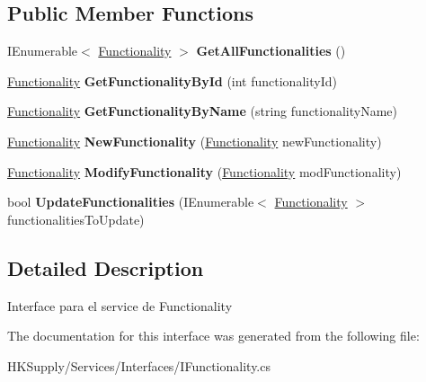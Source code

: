 \subsection*{Public Member Functions}
\begin{DoxyCompactItemize}
\item 
\mbox{\label{interface_h_k_supply_1_1_services_1_1_interfaces_1_1_i_functionality_aa1f16fee3ce5743db02605b4fd2184fc}} 
I\+Enumerable$<$ \hyperlink{class_h_k_supply_1_1_models_1_1_functionality}{Functionality} $>$ {\bfseries Get\+All\+Functionalities} ()
\item 
\mbox{\label{interface_h_k_supply_1_1_services_1_1_interfaces_1_1_i_functionality_a7652aa4269664c60c38868ca5691b39e}} 
\hyperlink{class_h_k_supply_1_1_models_1_1_functionality}{Functionality} {\bfseries Get\+Functionality\+By\+Id} (int functionality\+Id)
\item 
\mbox{\label{interface_h_k_supply_1_1_services_1_1_interfaces_1_1_i_functionality_a8b71832d394e3900a477c05c346489df}} 
\hyperlink{class_h_k_supply_1_1_models_1_1_functionality}{Functionality} {\bfseries Get\+Functionality\+By\+Name} (string functionality\+Name)
\item 
\mbox{\label{interface_h_k_supply_1_1_services_1_1_interfaces_1_1_i_functionality_ac11ba1039efa6437e0669e9617ea5c9c}} 
\hyperlink{class_h_k_supply_1_1_models_1_1_functionality}{Functionality} {\bfseries New\+Functionality} (\hyperlink{class_h_k_supply_1_1_models_1_1_functionality}{Functionality} new\+Functionality)
\item 
\mbox{\label{interface_h_k_supply_1_1_services_1_1_interfaces_1_1_i_functionality_a31203a06c78db03a2c9a69c0fa1a0865}} 
\hyperlink{class_h_k_supply_1_1_models_1_1_functionality}{Functionality} {\bfseries Modify\+Functionality} (\hyperlink{class_h_k_supply_1_1_models_1_1_functionality}{Functionality} mod\+Functionality)
\item 
\mbox{\label{interface_h_k_supply_1_1_services_1_1_interfaces_1_1_i_functionality_a7408965d17ce5d8a6fea11ac392ed451}} 
bool {\bfseries Update\+Functionalities} (I\+Enumerable$<$ \hyperlink{class_h_k_supply_1_1_models_1_1_functionality}{Functionality} $>$ functionalities\+To\+Update)
\end{DoxyCompactItemize}


\subsection{Detailed Description}
Interface para el service de Functionality 



The documentation for this interface was generated from the following file\+:\begin{DoxyCompactItemize}
\item 
H\+K\+Supply/\+Services/\+Interfaces/I\+Functionality.\+cs\end{DoxyCompactItemize}
